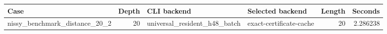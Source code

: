 {\small
\begin{tabular}{lrllrr}
\hline
Case & Depth & CLI backend & Selected backend & Length & Seconds \\
\hline
nissy\_benchmark\_distance\_20\_2 & 20 & universal\_resident\_h48\_batch & exact-certificate-cache & 20 & 2.286238 \\
\hline
\end{tabular}
}
